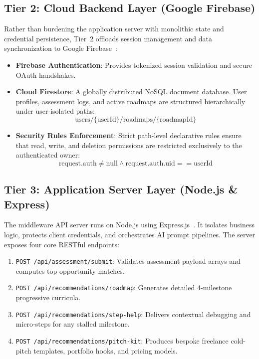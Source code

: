 \documentclass[conference]{IEEEtran}
\begin{document}
\subsection{Tier 2: Cloud Backend Layer (Google Firebase)}
Rather than burdening the application server with monolithic state and credential persistence, Tier~2 offloads session management and data synchronization to Google Firebase~\cite{moroney2017firebase}:
\begin{itemize}
    \item \textbf{Firebase Authentication}: Provides tokenized session validation and secure OAuth handshakes.
    \item \textbf{Cloud Firestore}: A globally distributed NoSQL document database. User profiles, assessment logs, and active roadmaps are structured hierarchically under user-isolated paths:
    $$\text{users}/\{\text{userId}\}/\text{roadmaps}/\{\text{roadmapId}\}$$
    \item \textbf{Security Rules Enforcement}: Strict path-level declarative rules ensure that read, write, and deletion permissions are restricted exclusively to the authenticated owner:
    $$\text{request.auth} \neq \text{null} \land \text{request.auth.uid} == \text{userId}$$
\end{itemize}

\subsection{Tier 3: Application Server Layer (Node.js \& Express)}
The middleware API server runs on Node.js using Express.js~\cite{fielding2000rest}. It isolates business logic, protects client credentials, and orchestrates AI prompt pipelines. The server exposes four core RESTful endpoints:
\begin{enumerate}
    \item \texttt{POST /api/assessment/submit}: Validates assessment payload arrays and computes top opportunity matches.
    \item \texttt{POST /api/recommendations/roadmap}: Generates detailed 4-milestone progressive curricula.
    \item \texttt{POST /api/recommendations/step-help}: Delivers contextual debugging and micro-steps for any stalled milestone.
    \item \texttt{POST /api/recommendations/pitch-kit}: Produces bespoke freelance cold-pitch templates, portfolio hooks, and pricing models.
\end{enumerate}
\end{document}

